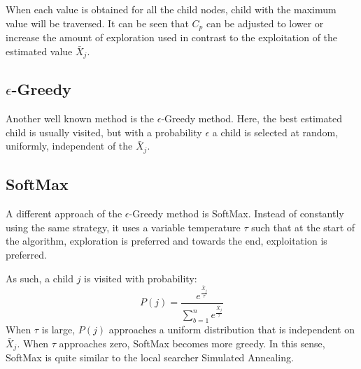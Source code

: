 \documentclass{acm_proc_article-sp}
\begin{document}
When each value is obtained for all the child nodes, child with the maximum value will be traversed. It can be seen that $C_p$ can be adjusted to lower or increase the amount of exploration used in contrast to the exploitation of the estimated value $\bar{X}_j$.

\subsection{$\epsilon$-Greedy}

Another well known method is the $\epsilon$-Greedy method. Here, the best estimated child is usually visited, but with a probability $\epsilon$ a child is selected at random, uniformly, independent of the $\bar{X}_j$.

\subsection{SoftMax}
A different approach of the $\epsilon$-Greedy method is SoftMax. Instead of constantly using the same strategy, it uses a variable temperature $\tau$ such that at the start of the algorithm, exploration is preferred and towards the end, exploitation is preferred. 

As such, a child $j$ is visited with probability:
\begin{equation}
P(j) = \frac{e^\frac{\bar{X}_j}{\tau}}{\sum_{b=1}^{n} e^\frac{\bar{X}_j}{\tau}}
\end{equation}
When $\tau$ is large, $P(j)$ approaches a uniform distribution that is independent on $\bar{X}_j$. When $\tau$ approaches zero, SoftMax becomes more greedy. In this sense, SoftMax is quite similar to the local searcher Simulated Annealing.
\end{document}
